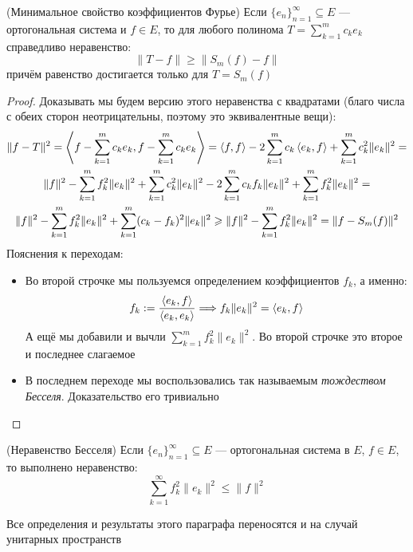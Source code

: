 \begin{theorem} (Минимальное свойство коэффициентов Фурье)
	Если $\{e_n\}_{n = 1}^\infty \subseteq E$ --- ортогональная система и $f \in E$, то для любого полинома $T = \sum_{k = 1}^m c_ke_k$ справедливо неравенство:
	\[
		\|T - f\| \ge \|S_m(f) - f\|
	\]
	причём равенство достигается только для $T = S_m(f)$
\end{theorem}

\begin{proof}
	Доказывать мы будем версию этого неравенства с квадратами (благо числа с обеих сторон неотрицательны, поэтому это эквивалентные вещи):
	\begin{multline*}
		\|f - T\|^2 = \left\langle f - \sum_{k = 1}^m c_ke_k, f - \sum_{k = 1}^m c_ke_k\right\rangle = \left\langle f, f\right\rangle - 2\sum_{k = 1}^m c_k \left\langle e_k, f\right\rangle + \sum_{k = 1}^m c_k^2 \|e_k\|^2 =
		\\
		\|f\|^2 - \sum_{k = 1}^m f_k^2\|e_k\|^2 + \sum_{k = 1}^m c_k^2\|e_k\|^2 - 2\sum_{k = 1}^m c_kf_k\|e_k\|^2 + \sum_{k = 1}^m f_k^2\|e_k\|^2 =
		\\
		\|f\|^2 - \sum_{k = 1}^m f_k^2\|e_k\|^2 + \sum_{k = 1}^m (c_k - f_k)^2\|e_k\|^2 \geqslant \|f\|^2 - \sum_{k = 1}^m f_k^2\|e_k\|^2 = \|f - S_m(f)\|^2
	\end{multline*}
	Пояснения к переходам:
	\begin{itemize}
		\item Во второй строчке мы пользуемся определением коэффициентов $f_k$, а именно:
		\[
			f_k := \frac{\left\langle e_k, f\right\rangle}{\left\langle e_k, e_k\right\rangle} \Longrightarrow f_k\|e_k\|^2 = \left\langle e_k, f\right\rangle
		\]
		А ещё мы добавили и вычли $\sum_{k = 1}^m f_k^2\|e_k\|^2$. Во второй строчке это второе и последнее слагаемое
		
		\item В последнем переходе мы воспользовались так называемым \textit{тождеством Бесселя}. Доказательство его тривиально
	\end{itemize}
\end{proof}

\begin{corollary} (Неравенство Бесселя)
	Если $\{e_n\}_{n = 1}^\infty \subseteq E$ --- ортогональная система в $E$, $f \in E$, то выполнено неравенство:
	\[
		\sum_{k = 1}^\infty f_k^2\|e_k\|^2 \le \|f\|^2
	\]
\end{corollary}

\begin{note}
	Все определения и результаты этого параграфа переносятся и на случай унитарных пространств
\end{note}

